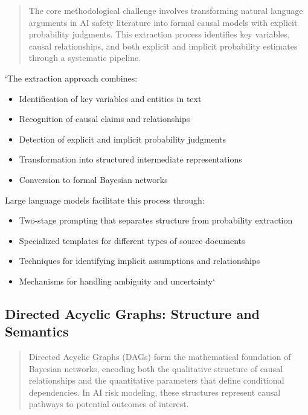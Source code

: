 \documentclass[]{book}
\providecommand{\tightlist}{%
  \setlength{\itemsep}{0pt}\setlength{\parskip}{0pt}}
\begin{document}
\begin{quote}
The core methodological challenge involves transforming natural language
arguments in AI safety literature into formal causal models with
explicit probability judgments. This extraction process identifies key
variables, causal relationships, and both explicit and implicit
probability estimates through a systematic pipeline.
\end{quote}

`The extraction approach combines:

\begin{itemize}
\tightlist
\item
  Identification of key variables and entities in text
\item
  Recognition of causal claims and relationships
\item
  Detection of explicit and implicit probability judgments
\item
  Transformation into structured intermediate representations
\item
  Conversion to formal Bayesian networks
\end{itemize}

Large language models facilitate this process through:

\begin{itemize}
\tightlist
\item
  Two-stage prompting that separates structure from probability
  extraction
\item
  Specialized templates for different types of source documents
\item
  Techniques for identifying implicit assumptions and relationships
\item
  Mechanisms for handling ambiguity and uncertainty`
\end{itemize}

\subsection{Directed Acyclic Graphs: Structure and
Semantics}\label{sec-directed-acyclic-graphs}

\begin{quote}
Directed Acyclic Graphs (DAGs) form the mathematical foundation of
Bayesian networks, encoding both the qualitative structure of causal
relationships and the quantitative parameters that define conditional
dependencies. In AI risk modeling, these structures represent causal
pathways to potential outcomes of interest.
\end{quote}
\end{document}
